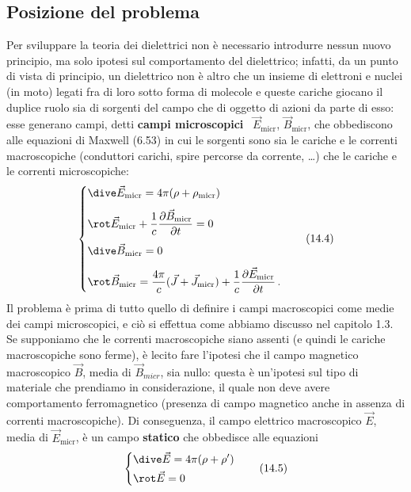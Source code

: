 \subsection{Posizione del problema}

Per sviluppare la teoria dei dielettrici non \`e necessario introdurre nessun
nuovo principio, ma solo ipotesi sul comportamento del dielettrico; infatti, da
un punto di vista di principio, un dielettrico non \`e altro che un insieme di
elettroni e nuclei (in moto) legati fra di loro sotto forma di molecole e queste
cariche giocano il duplice ruolo sia di sorgenti del campo che di oggetto di
azioni da parte di esso: esse generano campi, detti \textbf{campi microscopici}
\ $\vec E_\mathrm{micr}$, $\vec B_\mathrm{micr}$, che obbediscono alle equazioni
di Maxwell (6.53) in cui le sorgenti sono sia le cariche e le correnti
macroscopiche (conduttori carichi, spire percorse da corrente, \dots) che le
cariche e le correnti microscopiche:
\begin{equation}
  \left\{\begin{aligned}
    &\dive\vec E_\mathrm{micr}=4\pi(\rho+\rho_\mathrm{micr})\\[4pt]
    &\rot\vec E_\mathrm{micr}
    +\frac{1}{c}\frac{\partial\vec B_\mathrm{micr}}{\partial t}=0\\[4pt]
    &\dive\vec B_\mathrm{micr}=0\\[4pt]
    &\rot\vec B_\mathrm{micr}=\frac{4\pi}{c}(\vec J+\vec J_\mathrm{micr})
    +\frac{1}{c}\frac{\partial\vec E_\mathrm{micr}}{\partial t}\,.
  \end{aligned}\right.
  \tag{14.4}
\end{equation}
Il problema \`e prima di tutto quello di definire i campi macroscopici come
medie dei campi microscopici, e ci\`o si effettua come abbiamo discusso nel
capitolo 1.3. Se supponiamo che le correnti macroscopiche siano assenti (e
quindi le cariche macroscopiche sono ferme), \`e lecito fare l'ipotesi che il
campo magnetico macroscopico $\vec B$, media di $\vec B_{micr}$, sia nullo:
questa \`e un'ipotesi sul tipo di materiale che prendiamo in considerazione, il
quale non deve avere comportamento ferromagnetico (presenza di campo magnetico
anche in assenza di correnti macroscopiche). Di conseguenza, il campo elettrico
macroscopico $\vec E$, media di $\vec E_\mathrm{micr}$, \`e un campo
\textbf{statico} che obbedisce alle equazioni
\begin{equation}
  \left\{\begin{aligned}
    &\dive\vec E=4\pi(\rho+\rho')\\
    &\rot\vec E=0
  \end{aligned}\right.
  \tag{14.5}
\end{equation}
